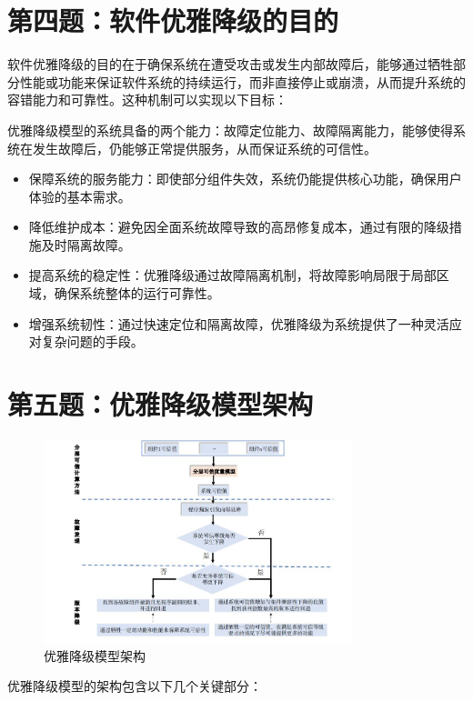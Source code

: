 \documentclass[14pt,a4paper,UTF8,twoside]{article}
\begin{document}
\section{第四题：软件优雅降级的目的}

软件优雅降级的目的在于确保系统在遭受攻击或发生内部故障后，能够通过牺牲部分性能或功能来保证软件系统的持续运行，而非直接停止或崩溃，从而提升系统的容错能力和可靠性。这种机制可以实现以下目标：

优雅降级模型的系统具备的两个能力：故障定位能力、故障隔离能力，能够使得系统在发生故障后，仍能够正常提供服务，从而保证系统的可信性。

\begin{itemize}
    \item 保障系统的服务能力：即使部分组件失效，系统仍能提供核心功能，确保用户体验的基本需求。
    \item 降低维护成本：避免因全面系统故障导致的高昂修复成本，通过有限的降级措施及时隔离故障。
    \item 提高系统的稳定性：优雅降级通过故障隔离机制，将故障影响局限于局部区域，确保系统整体的运行可靠性。
    \item 增强系统韧性：通过快速定位和隔离故障，优雅降级为系统提供了一种灵活应对复杂问题的手段。
\end{itemize}

\section{第五题：优雅降级模型架构}

\begin{figure}[H]
    \centering
    \includegraphics[width=0.8\textwidth]{img10/model.png}
    \caption{优雅降级模型架构}
\end{figure}

优雅降级模型的架构包含以下几个关键部分：
\end{document}
